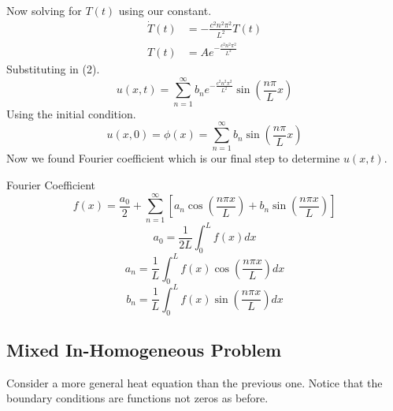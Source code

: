 Now solving for $T(t)$ using our constant.
\begin{align*}
\dot{T}(t) &= -\frac{c^2 n^2 \pi^2}{L^2} T(t)
\\
T(t) &= Ae^{\textstyle -\frac{c^2 n^2 \pi^2}{L^2}}
\end{align*}
Substituting in (2).
\[
    u(x,t) = \sum_{n=1}^{\infty} b_n e^{\textstyle -\frac{c^2 n^2 \pi^2}{L^2}}\sin\left(\frac{n\pi}{L}x\right)    
\]
Using the initial condition.
\[
    u(x,0) = \phi(x) = \sum_{n=1}^{\infty} b_n \sin\left(\frac{n\pi}{L}x\right)    
\]
Now we found Fourier coefficient which is our final step to determine $u(x,t)$.
\begin{enrichment*}{Fourier Coefficient}
    \[
        f(x) = \frac{a_0}{2}  + \sum_{n=1}^{\infty}\left[a_n \cos\left(\frac{n\pi x}{L}\right) + b_n \sin\left(\frac{n\pi x}{L}\right) \right]
    \]
    \[
        a_0 = \frac{1}{2L}\int_{0}^{L}f(x)dx
    \]
    \[
        a_n = \frac{1}{L}\int_{0}^{L}f(x)\cos\left(\frac{n\pi x}{L}\right)dx
    \]
    \[
        b_n = \frac{1}{L}\int_{0}^{L}f(x)\sin\left(\frac{n\pi x}{L}\right)dx
    \]
\end{enrichment*}

\setcounter{equation}{0}
\subsection{Mixed In-Homogeneous Problem}
Consider a more general heat equation than the previous one. Notice that the boundary conditions are functions not zeros as before.

